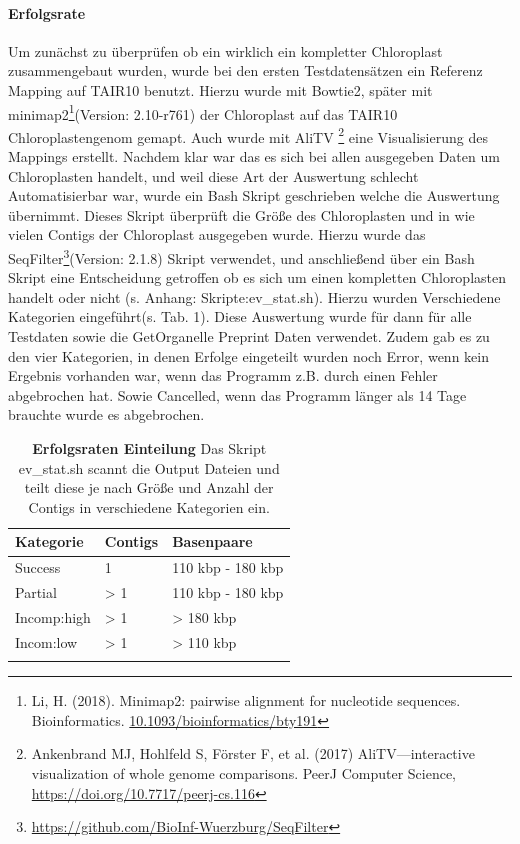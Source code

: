 \documentclass{scrartcl}
\begin{document}
\paragraph{Erfolgsrate}
\label{sec-3-1-2-2}
Um zunächst zu überprüfen ob ein wirklich ein kompletter Chloroplast zusammengebaut wurden, wurde bei den ersten Testdatensätzen ein Referenz Mapping auf
TAIR10 benutzt. Hierzu wurde mit Bowtie2, später mit minimap2\footnote{Li, H. (2018). Minimap2: pairwise alignment for nucleotide sequences. Bioinformatics. \url{10.1093/bioinformatics/bty191}}(Version: 2.10-r761) der Chloroplast auf das TAIR10 Chloroplastengenom gemapt. Auch wurde mit AliTV \footnote{Ankenbrand MJ, Hohlfeld S, Förster F, et al. (2017) AliTV—interactive visualization of whole genome comparisons. PeerJ Computer Science, \url{https://doi.org/10.7717/peerj-cs.116}} 
eine Visualisierung des Mappings erstellt. Nachdem klar war das es sich bei allen ausgegeben Daten um Chloroplasten handelt, und weil diese Art der 
Auswertung schlecht Automatisierbar war, wurde ein Bash Skript geschrieben welche die Auswertung übernimmt. Dieses Skript überprüft die Größe des
Chloroplasten und in wie vielen Contigs der Chloroplast ausgegeben wurde. Hierzu wurde das SeqFilter\footnote{\url{https://github.com/BioInf-Wuerzburg/SeqFilter}}(Version: 2.1.8) Skript verwendet, und anschließend über ein Bash
Skript eine Entscheidung getroffen ob es sich um einen kompletten Chloroplasten handelt oder nicht (s. Anhang: Skripte:ev\_stat.sh). Hierzu wurden Verschiedene
Kategorien eingeführt(s. Tab. 1). Diese Auswertung wurde für dann für alle Testdaten sowie die GetOrganelle Preprint Daten verwendet. Zudem gab es zu den vier Kategorien, in denen
Erfolge eingeteilt wurden noch Error, wenn kein Ergebnis vorhanden war, wenn das Programm z.B. durch einen Fehler abgebrochen hat. Sowie Cancelled, wenn das Programm länger als 14 Tage brauchte 
wurde es abgebrochen.
\begin{table}[!h]
\caption[Erfolgsraten Einteilung]{\textbf{Erfolgsraten Einteilung} Das Skript ev\_stat.sh scannt die Output Dateien und teilt diese je nach Größe und Anzahl der Contigs in verschiedene Kategorien ein. }
\begin{center}
\begin{tabular}{lll}
Kategorie & Contigs & Basenpaare\\
\hline
Success & 1 & 110 kbp - 180 kbp\\
Partial & > 1 & 110 kbp - 180 kbp\\
Incomp:high & > 1 & > 180 kbp\\
Incom:low & > 1 & > 110 kbp\\
 &  & \\
\end{tabular}
\end{center}
\end{table}
\end{document}
